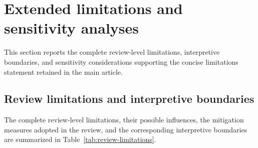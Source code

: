 \documentclass[12pt]{article}
\numberwithin{equation}{section}
\begin{document}
\FloatBarrier



\section{Extended limitations and sensitivity analyses}
\label{sec:supp-limitations-and-sensitivity-analyses}

This section reports the complete review-level limitations, interpretive
boundaries, and sensitivity considerations supporting the concise limitations statement retained in the main article.

\subsection{Review limitations and interpretive boundaries}

The complete review-level limitations, their possible influences, the
mitigation measures adopted in the review, and the corresponding interpretive
boundaries are summarized in Table~\ref{tab:review-limitations}.

% 
\end{document}
